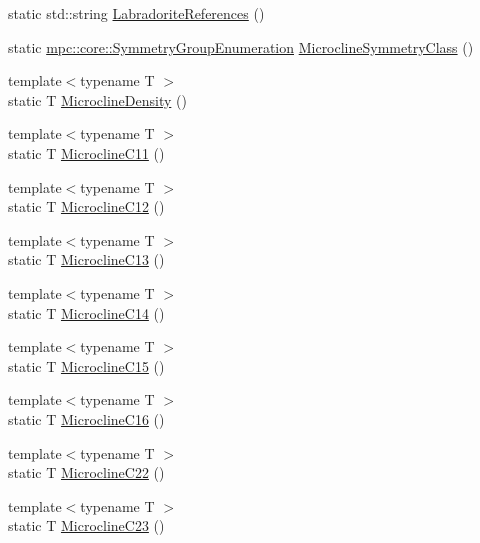 \begin{DoxyCompactItemize}
\item 
static std\+::string \mbox{\hyperlink{namespacempc_1_1data_a030b6ce7231ccfb0e3ac4fdc872edcbf}{Labradorite\+References}} ()
\item 
static \mbox{\hyperlink{namespacempc_1_1core_a9d979684062547055a0ef5c13077bad8}{mpc\+::core\+::\+Symmetry\+Group\+Enumeration}} \mbox{\hyperlink{namespacempc_1_1data_aa51ae2cf0152d92fe3869d413d84a51f}{Microcline\+Symmetry\+Class}} ()
\item 
{\footnotesize template$<$typename T $>$ }\\static T \mbox{\hyperlink{namespacempc_1_1data_a0cb009cb9eeae02f75253cf33a717456}{Microcline\+Density}} ()
\item 
{\footnotesize template$<$typename T $>$ }\\static T \mbox{\hyperlink{namespacempc_1_1data_ae1104e84795cd3422116236f70bfe596}{Microcline\+C11}} ()
\item 
{\footnotesize template$<$typename T $>$ }\\static T \mbox{\hyperlink{namespacempc_1_1data_aedb1f81db73ed10d6a42f9fce5d0727b}{Microcline\+C12}} ()
\item 
{\footnotesize template$<$typename T $>$ }\\static T \mbox{\hyperlink{namespacempc_1_1data_afa6b7fb7d0fa4a7ef3a311f67659fbc8}{Microcline\+C13}} ()
\item 
{\footnotesize template$<$typename T $>$ }\\static T \mbox{\hyperlink{namespacempc_1_1data_a3ca77b27b5954b599fe318a1575552d5}{Microcline\+C14}} ()
\item 
{\footnotesize template$<$typename T $>$ }\\static T \mbox{\hyperlink{namespacempc_1_1data_aed7d6ec2cbbfc7843b110cd30350dce6}{Microcline\+C15}} ()
\item 
{\footnotesize template$<$typename T $>$ }\\static T \mbox{\hyperlink{namespacempc_1_1data_ab55600e0da8105aa8ee8fd9d776f3623}{Microcline\+C16}} ()
\item 
{\footnotesize template$<$typename T $>$ }\\static T \mbox{\hyperlink{namespacempc_1_1data_aacb26b76c540bbffc4bbeeb405779b3b}{Microcline\+C22}} ()
\item 
{\footnotesize template$<$typename T $>$ }\\static T \mbox{\hyperlink{namespacempc_1_1data_a5fb6b300ec775eb4f62070b5bc171c95}{Microcline\+C23}} ()
\item 

\end{DoxyCompactItemize}
